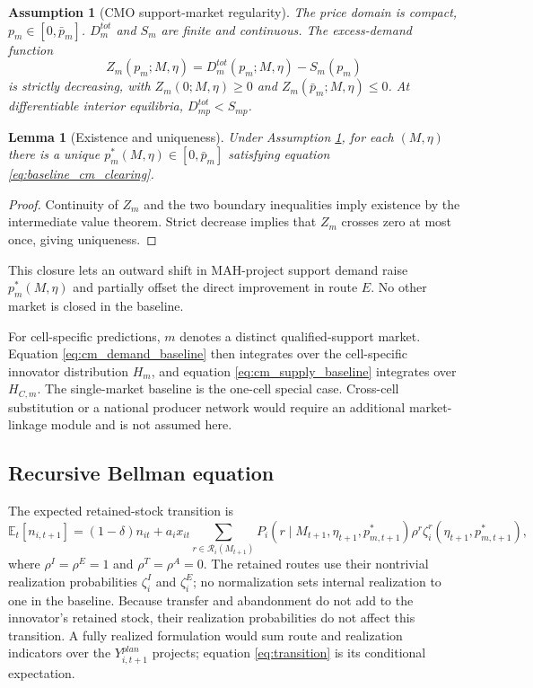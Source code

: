 \documentclass[12pt]{article}
\newtheorem{assumption}{Assumption}
\newtheorem{lemma}{Lemma}
\newcommand{\E}{\mathbb{E}}
\newcommand{\1}{\mathbf{1}}
\newcommand{\calR}{\mathcal{R}}
\begin{document}
\begin{assumption}[CMO support-market regularity]
\label{ass:cmo_market_regular}
The price domain is compact, $p_m\in[0,\bar p_m]$. $D_m^{tot}$ and $S_m$ are finite and continuous. The excess-demand function
\[
    Z_m(p_m;M,\eta)
    =D_m^{tot}(p_m;M,\eta)-S_m(p_m)
\]
is strictly decreasing, with $Z_m(0;M,\eta)\ge0$ and $Z_m(\bar p_m;M,\eta)\le0$. At differentiable interior equilibria, $D_{mp}^{tot}<S_{mp}$.
\end{assumption}

\begin{lemma}[Existence and uniqueness]
\label{lem:cmo_existence}
Under Assumption \ref{ass:cmo_market_regular}, for each $(M,\eta)$ there is a unique $p_m^*(M,\eta)\in[0,\bar p_m]$ satisfying equation \eqref{eq:baseline_cm_clearing}.
\end{lemma}

\begin{proof}
Continuity of $Z_m$ and the two boundary inequalities imply existence by the intermediate value theorem. Strict decrease implies that $Z_m$ crosses zero at most once, giving uniqueness.
\end{proof}

This closure lets an outward shift in MAH-project support demand raise $p_m^*(M,\eta)$ and partially offset the direct improvement in route $E$. No other market is closed in the baseline.

For cell-specific predictions, $m$ denotes a distinct qualified-support market. Equation \eqref{eq:cm_demand_baseline} then integrates over the cell-specific innovator distribution $H_m$, and equation \eqref{eq:cm_supply_baseline} integrates over $H_{C,m}$. The single-market baseline is the one-cell special case. Cross-cell substitution or a national producer network would require an additional market-linkage module and is not assumed here.

\subsection{Recursive Bellman equation}

The expected retained-stock transition is
\begin{equation}
    \E_t[n_{i,t+1}]
    =
    (1-\delta)n_{it}
    +
    a_i x_{it}
    \sum_{r\in\calR_i(M_{t+1})}
    P_i(r\mid M_{t+1},\eta_{t+1},p^*_{m,t+1})
    \rho^r\zeta_i^r(\eta_{t+1},p^*_{m,t+1}),
    \label{eq:transition}
\end{equation}
where $\rho^I=\rho^E=1$ and $\rho^T=\rho^A=0$. The retained routes use their nontrivial realization probabilities $\zeta_i^I$ and $\zeta_i^E$; no normalization sets internal realization to one in the baseline. Because transfer and abandonment do not add to the innovator's retained stock, their realization probabilities do not affect this transition. A fully realized formulation would sum route and realization indicators over the $Y_{i,t+1}^{plan}$ projects; equation \eqref{eq:transition} is its conditional expectation.
\end{document}
